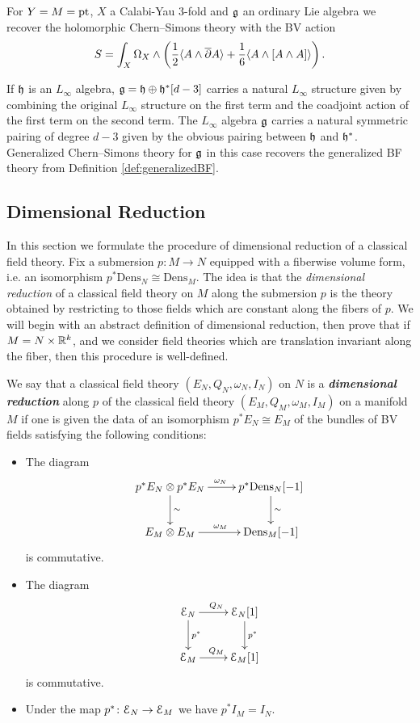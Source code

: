 \documentclass[10pt, oneside]{article}
\newcommand{\Dens}{\mathrm{Dens}}
\newcommand{\defterm}[1]{\textbf{\emph{#1}}}
\begin{document}
\begin{example}
For $Y=M=\operatorname{pt}$, $X$ a Calabi-Yau 3-fold and $\mathfrak g$ an ordinary Lie algebra we recover the holomorphic Chern--Simons theory with the BV action
\[S = \int_X \Omega_X\wedge \left(\frac{1}{2}\langle A\wedge \overline{\partial} A\rangle + \frac{1}{6}\langle A\wedge [A\wedge A]\rangle\right).\]
\end{example}

\begin{example}
If $\mathfrak h$ is an $L_\infty$ algebra, $\mathfrak g = \mathfrak h \oplus \mathfrak h^*[d-3]$ carries a natural $L_\infty$ structure given by combining the original $L_\infty$ structure on the first term and the coadjoint action of the first term on the second term. The $L_\infty$ algebra $\mathfrak g$ carries a natural symmetric pairing of degree $d-3$ given by the obvious pairing between $\mathfrak h$ and $\mathfrak h^*$. Generalized Chern--Simons theory for $\mathfrak g$ in this case recovers the generalized BF theory from Definition \ref{def:generalizedBF}.
\end{example}

\subsection{Dimensional Reduction} \label{dim_red_section}

In this section we formulate the procedure of dimensional reduction of a classical field theory. Fix a submersion $p\colon M\rightarrow N$ equipped with a fiberwise volume form, i.e. an isomorphism $p^*\Dens_N\cong \Dens_M$.  The idea is that the \emph{dimensional reduction} of a classical field theory on $M$ along the submersion $p$ is the theory obtained by restricting to those fields which are constant along the fibers of $p$.  We will begin with an abstract definition of dimensional reduction, then prove that if $M = N \times \mathbb R^k$, and we consider field theories which are translation invariant along the fiber, then this procedure is well-defined.

\begin{definition}
We say that a classical field theory $(E_N, Q_N, \omega_N, I_N)$ on $N$ is a \defterm{dimensional reduction} along $p$ of the classical field theory $(E_M, Q_M, \omega_M, I_M)$ on a manifold $M$ if one is given the data of an isomorphism $p^* E_N\cong E_M$ of the bundles of BV fields satisfying the following conditions:
\begin{itemize}
\item The diagram
\[
\xymatrix{
p^* E_N\otimes p^* E_N \ar^{\omega_N}[r] \ar^{\sim}[d] & p^*\Dens_N[-1] \ar^{\sim}[d] \\
E_M\otimes E_M \ar^{\omega_M}[r] & \Dens_M[-1]
}
\]
is commutative.

\item The diagram
\[
\xymatrix{
\cE_N \ar^{Q_N}[r] \ar^{p^*}[d] & \cE_N[1] \ar^{p^*}[d] \\
\cE_M \ar^{Q_M}[r] & \cE_M[1]
}
\]
is commutative.

\item Under the map $p^*\colon \mathcal E_N\rightarrow \mathcal E_M$ we have $p^* I_M = I_N$.
\end{itemize}
\end{definition}
\end{document}
